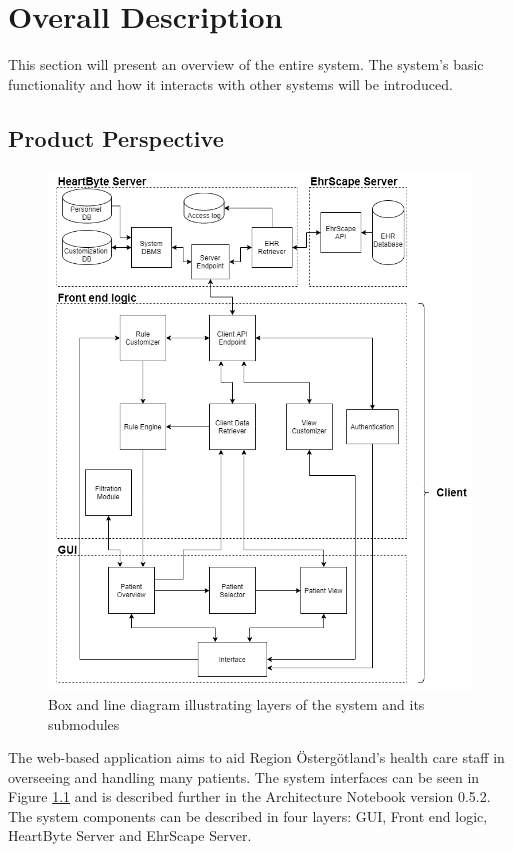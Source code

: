 \documentclass{scrreprt}
\begin{document}
\chapter{Overall Description}
This section will present an overview of the entire system. The system's basic functionality and how it interacts with other systems will be introduced. %

\section{Product Perspective}
\begin{figure}[htp]
    \centering
    \includegraphics[width=15cm]{architecture.png}
    \caption{Box and line diagram illustrating layers of the system and its submodules}
    \label{fig: boxAndLineDiag}
\end{figure}
The web-based application aims to aid Region Östergötland's health care staff in overseeing and handling many patients. The system interfaces can be seen in Figure \ref{fig: boxAndLineDiag} and is described further in the Architecture Notebook version 0.5.2. The system components can be described in four layers: GUI, Front end logic, HeartByte Server and EhrScape Server.
\end{document}
